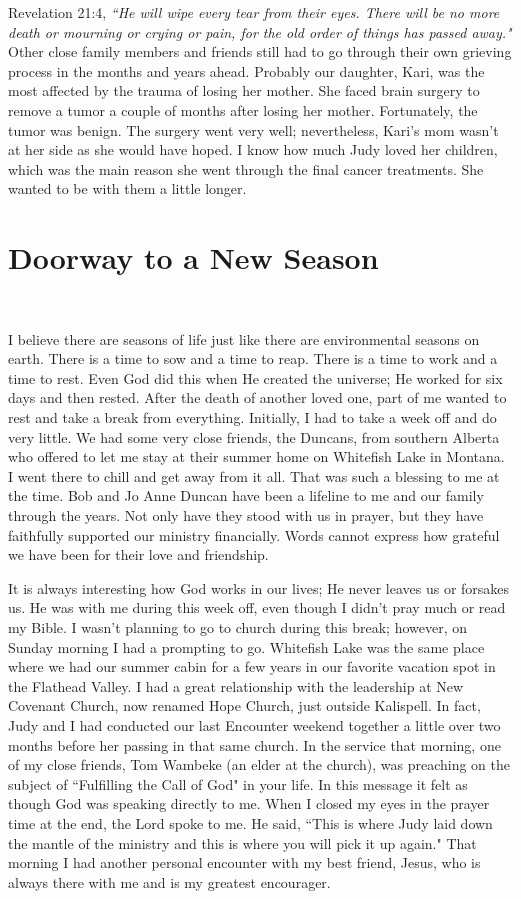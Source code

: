 \documentclass[oneside,12pt]{book}
\begin{document}
Revelation 21:4, \textit{``He will wipe every tear from their eyes. There will be no more death or mourning or crying or pain, for the old order of things has passed away."}
Other close family members and friends still had to go through their own grieving process in the months and years ahead. Probably our daughter, Kari, was the most affected by the trauma of losing her mother. She faced brain surgery to remove a tumor a couple of months after losing her mother. Fortunately, the tumor was benign. The surgery went very well; nevertheless, Kari's mom wasn't at her side as she would have hoped. I know how much Judy loved her children, which was the main reason she went through the final cancer treatments. She wanted to be with them a little longer.


\section{Doorway to a New Season}
\

I believe there are seasons of life just like there are environmental seasons on earth. There is a time to sow and a time to reap. There is a time to work and a time to rest. Even God did this when He created the universe; He worked for six days and then rested. After the death of another loved one, part of me wanted to rest and take a break from everything. Initially, I had to take a week off and do very little. We had some very close friends, the Duncans, from southern Alberta who offered to let me stay at their summer home on Whitefish Lake in Montana. I went there to chill and get away from it all. That was such a blessing to me at the time. Bob and Jo Anne Duncan have been a lifeline to me and our family through the years. Not only have they stood with us in prayer, but they have faithfully supported our ministry financially. Words cannot express how grateful we have been for their love and friendship.

It is always interesting how God works in our lives; He never leaves us or forsakes us. He was with me during this week off, even though I didn't pray much or read my Bible. I wasn't planning to go to church during this break; however, on Sunday morning I had a prompting to go. Whitefish Lake was the same place where we had our summer cabin for a few years in our favorite vacation spot in the Flathead Valley. I had a great relationship with the leadership at New Covenant Church, now renamed Hope Church, just outside Kalispell. In fact, Judy and I had conducted our last Encounter weekend together a little over two months before her passing in that same church. In the service that morning, one of my close friends, Tom Wambeke (an elder at the church), was preaching on the subject of ``Fulfilling the Call of God" in your life. In this message it felt as though God was speaking directly to me. When I closed my eyes in the prayer time at the end, the Lord spoke to me. He said, ``This is where Judy laid down the mantle of the ministry and this is where you will pick it up again." That morning I had another personal encounter with my best friend, Jesus, who is always there with me and is my greatest encourager.
\end{document}
